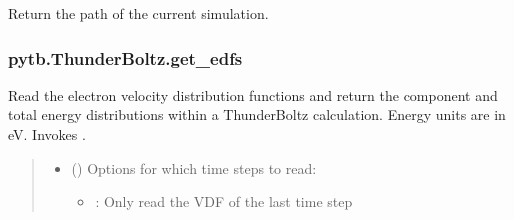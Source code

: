 \documentclass[letterpaper,10pt,english,openany,oneside]{sphinxmanual}
\begin{document}
\begin{fulllineitems}
\begin{fulllineitems}
\label{\detokenize{api/pytb.ThunderBoltz.get_directory:pytb.ThunderBoltz.get_directory}}
\pysigstartsignatures
{}
\pysigstopsignatures
\sphinxAtStartPar
Return the path of the current simulation.

\end{fulllineitems}


\sphinxstepscope


\subsubsection{pytb.ThunderBoltz.get\_edfs}
\label{\detokenize{api/pytb.ThunderBoltz.get_edfs:pytb-thunderboltz-get-edfs}}\label{\detokenize{api/pytb.ThunderBoltz.get_edfs::doc}}

\begin{fulllineitems}
\label{\detokenize{api/pytb.ThunderBoltz.get_edfs:pytb.ThunderBoltz.get_edfs}}
\pysigstartsignatures
{}
\pysigstopsignatures
\sphinxAtStartPar
Read the electron velocity distribution functions and return
the component and total energy distributions within a
ThunderBoltz calculation. Energy units are in eV. Invokes
{\hyperref[\detokenize{api/pytb.ThunderBoltz.get_vdfs:pytb.ThunderBoltz.get_vdfs}]{}}.
\begin{quote}\begin{description}
\begin{itemize}
\item {} 
\sphinxAtStartPar
{} (\sphinxstyleliteralemphasis{\sphinxupquote{, }}\sphinxstyleliteralemphasis{\sphinxupquote{{[}}}\sphinxstyleliteralemphasis{\sphinxupquote{{]}}}) \textendash{} 
\sphinxAtStartPar
Options for which time steps to
read:
\begin{itemize}
\item {} 
\sphinxAtStartPar
{}: Only read the VDF of the last time step


\end{itemize}
\end{itemize}
\end{description}
\end{quote}
\end{fulllineitems}
\end{fulllineitems}
\end{document}
